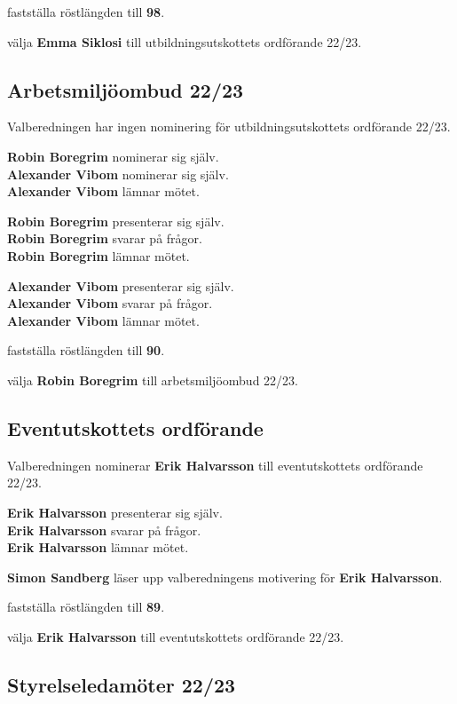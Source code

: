 \documentclass[../protokoll_vintermote_2022.tex]{subfiles}
\begin{document}
\motetbeslutar\att{} fastställa röstlängden till \textbf{98}.

\motetbeslutar\att{} välja \textbf{Emma Siklosi} till utbildningsutskottets ordförande 22/23.





\subsection{Arbetsmiljöombud 22/23}
Valberedningen har ingen nominering för utbildningsutskottets ordförande 22/23.

\textbf{Robin Boregrim} nominerar sig själv. \\
\textbf{Alexander Vibom} nominerar sig själv. \\
\textbf{Alexander Vibom} lämnar mötet.


\textbf{Robin Boregrim} presenterar sig själv. \\
\textbf{Robin Boregrim} svarar på frågor. \\
\textbf{Robin Boregrim} lämnar mötet.

\textbf{Alexander Vibom} presenterar sig själv. \\
\textbf{Alexander Vibom} svarar på frågor. \\
\textbf{Alexander Vibom} lämnar mötet.

\motetbeslutar\att{} fastställa röstlängden till \textbf{90}.

\motetbeslutar\att{} välja \textbf{Robin Boregrim} till arbetsmiljöombud 22/23.

\subsection{Eventutskottets ordförande}
Valberedningen nominerar \textbf{Erik Halvarsson} till eventutskottets ordförande 22/23.

\textbf{Erik Halvarsson} presenterar sig själv. \\
\textbf{Erik Halvarsson} svarar på frågor. \\
\textbf{Erik Halvarsson} lämnar mötet.

\textbf{Simon Sandberg} läser upp valberedningens motivering för \textbf{Erik Halvarsson}.

\motetbeslutar\att{} fastställa röstlängden till \textbf{89}.

\motetbeslutar\att{} välja \textbf{Erik Halvarsson} till eventutskottets ordförande 22/23.

\subsection{Styrelseledamöter 22/23}
\end{document}
